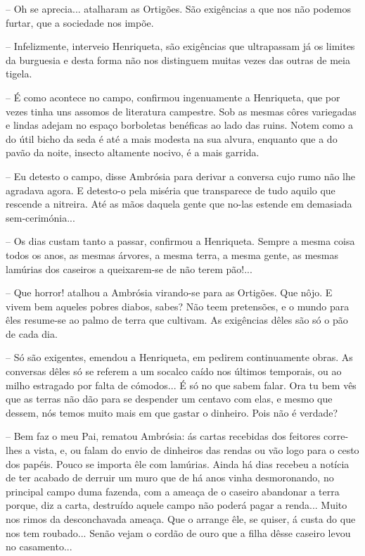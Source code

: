 \documentclass[9pt]{article}
\begin{document}
-- Oh se aprecia... ata\-lharam as Ortigões. São exi\-gên\-cias a que nos
não podemos furtar, que a sociedade nos impõe.

-- Infelizmente, interveio Henriqueta, são exi\-gên\-cias que ultrapassam
já os limites da burguesia e desta forma não nos distinguem  muitas vezes das outras de meia tigela.

-- É como acontece no campo, confirmou ingenuamente a Henriqueta, que
por vezes tinha uns assomos de literatura campestre. Sob as mesmas côres
variegadas e lindas adejam no espaço borboletas benéfi\-cas ao lado das
ruins. Notem como a do útil bicho da seda é até a mais modesta na sua
alvura, enquanto que a do pavão da noite, insecto altamente nocivo, é a
mais garrida.

-- Eu detesto o campo, disse Ambrósia para derivar a conversa cujo
rumo não lhe agradava agora. E detesto-o pela miséria que transparece
de tudo aquilo que rescende a nitreira. Até as mãos daquela
gente que no-las estende em demasiada sem-cerimónia...

-- Os dias custam tanto a passar, confirmou a Henriqueta. Sempre a
mesma coisa todos os anos, as mesmas árvores, a mesma terra, a mesma gente,
as mesmas lamúrias dos caseiros a queixarem-se de não terem pão!...

-- Que horror! ata\-lhou a Ambrósia virando-se para as Ortigões. Que
nôjo. E vivem bem aqueles pobres diabos, sabes? Não teem pretensões, e o
mundo para êles resume-se ao palmo de terra que cultivam. As exi\-gên\-cias
dêles são só o pão de cada dia.

-- Só são exigentes, emendou a Henriqueta, em pedirem continuamente
obras. As conversas dêles só se referem a um socalco caído nos últimos
temporais, ou ao mi\-lho estragado por falta de cómodos... É só no que
sabem falar. Ora tu bem vês que as terras não dão para se despender um
centavo com elas, e mesmo que dessem, nós temos muito mais em que gastar
o dinheiro. Pois não é verdade?

-- Bem faz o meu Pai, rematou Ambrósia: ás cartas recebidas dos feitores corre-\-lhes a vista, e, ou falam do envio de dinheiros das rendas
ou vão logo para o cesto dos papéis. Pouco se importa êle com lamúrias.
Ainda há dias recebeu a notícia de ter acabado de derruir um muro que
de há anos vinha desmoronando, no principal campo duma fazenda, com a ameaça de o caseiro abandonar a terra porque, diz a carta, destruído aquele
campo não poderá pagar a renda... Muito nos rimos da desconchavada
ameaça. Que o arrange êle, se quiser, á custa do que nos tem roubado...
Senão vejam o cordão de ouro que a fi\-lha dêsse caseiro levou no casamento...
\end{document}
